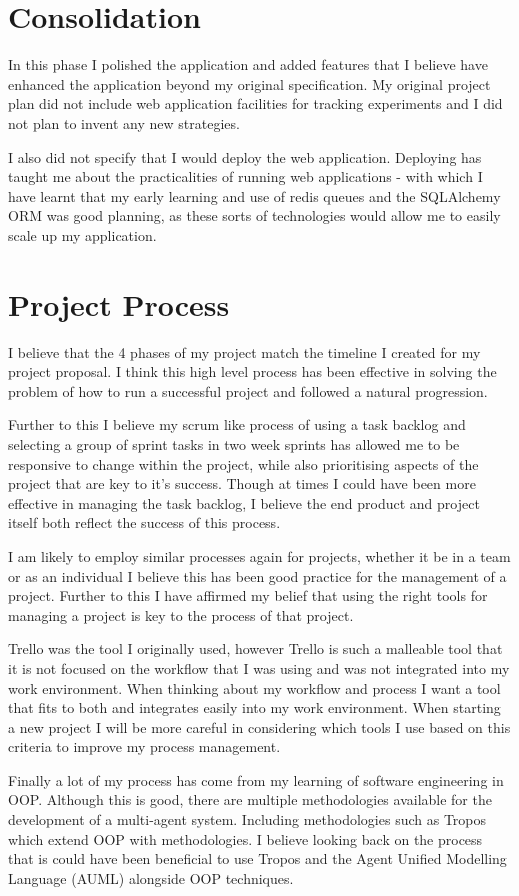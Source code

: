 \documentclass[]{final_report}
\begin{document}
\section{Consolidation}
In this phase I polished the application and added features that I believe have enhanced the application beyond my original specification. My original project plan did not include web application facilities for tracking experiments and I did not plan to invent any new strategies.\par 
I also did not specify that I would deploy the web application. Deploying has taught me about the practicalities of running web applications - with which I have learnt that my early learning and use of redis queues and the SQLAlchemy ORM was good planning, as these sorts of technologies would allow me to easily scale up my application.

\section{Project Process}
I believe that the 4 phases of my project match the timeline I created for my project proposal. I think this high level process has been effective in solving the problem of how to run a successful project and followed a natural progression.\par 
Further to this I believe my scrum like process of using a task backlog and selecting a group of sprint tasks in two week sprints has allowed me to be responsive to change within the project, while also prioritising aspects of the project that are key to it's success. Though at times I could have been more effective in managing the task backlog, I believe the end product and project itself both reflect the success of this process.\par 
I am likely to employ similar processes again for projects, whether it be in a team or as an individual I believe this has been good practice for the management of a project. Further to this I have affirmed my belief that using the right tools for managing a project is key to the process of that project.\par  
Trello was the tool I originally used, however Trello is such a malleable tool that it is not focused on the workflow that I was using and was not integrated into my work environment. When thinking about my workflow and process I want a tool that fits to both and integrates easily into my work environment. When starting a new project I will be more careful in considering which tools I use based on this criteria to improve my process management.\par 
Finally a lot of my process has come from my learning of software engineering in OOP. Although this is good, there are multiple methodologies available for the development of a multi-agent system. Including methodologies such as Tropos which extend OOP with methodologies. I believe looking back on the process that is could have been beneficial to use Tropos and the Agent Unified Modelling Language (AUML) alongside OOP techniques.
\end{document}
